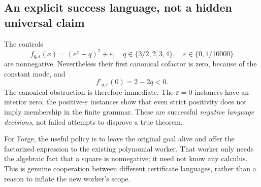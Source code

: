 \subsection{An explicit success language, not a hidden universal claim}

The controls
\begin{equation}
 f_{q,\varepsilon}(x)=(e^x-q)^2+\varepsilon,
 \quad q\in\{3/2,2,3,4\},\quad
 \varepsilon\in\{0,1/10000\}
 \label{eq:outside}
\end{equation}
are nonnegative. Nevertheless their first canonical cofactor is zero, because of the constant mode, and
\[
 f'_{q,\varepsilon}(0)=2-2q<0.
\]
The canonical obstruction is therefore immediate. The $\varepsilon=0$ instances have an interior zero; the positive-$\varepsilon$ instances show that even strict positivity does not imply membership in the finite grammar. These are successful \emph{negative language decisions}, not failed attempts to disprove a true theorem.

For Forge, the useful policy is to leave the original goal alive and offer the factorized expression to the existing polynomial worker. That worker only needs the algebraic fact that a square is nonnegative; it need not know any calculus. This is genuine cooperation between different certificate languages, rather than a reason to inflate the new worker's scope.
